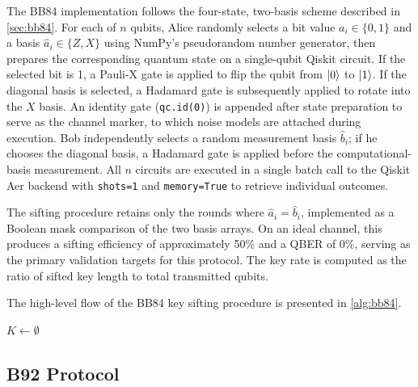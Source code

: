 \documentclass[10pt, a4paper]{report}
\begin{document}
The BB84 implementation follows the four-state, two-basis scheme described in \cref{sec:bb84}. For each of $n$ qubits, Alice randomly selects a bit value $a_i \in \{0,1\}$ and a basis $\hat{a}_i \in \{Z, X\}$ using NumPy's pseudorandom number generator, then prepares the corresponding quantum state on a single-qubit Qiskit circuit. If the selected bit is 1, a Pauli-X gate is applied to flip the qubit from $\ket{0}$ to $\ket{1}$. If the diagonal basis is selected, a Hadamard gate is subsequently applied to rotate into the $X$ basis. An identity gate (\texttt{qc.id(0)}) is appended after state preparation to serve as the channel marker, to which noise models are attached during execution. Bob independently selects a random measurement basis $\hat{b}_i$; if he chooses the diagonal basis, a Hadamard gate is applied before the computational-basis measurement. All $n$ circuits are executed in a single batch call to the Qiskit Aer backend with \texttt{shots=1} and \texttt{memory=True} to retrieve individual outcomes.

The sifting procedure retains only the rounds where $\hat{a}_i = \hat{b}_i$, implemented as a Boolean mask comparison of the two basis arrays. On an ideal channel, this produces a sifting efficiency of approximately 50\% and a QBER of 0\%, serving as the primary validation targets for this protocol. The key rate is computed as the ratio of sifted key length to total transmitted qubits.

% 

The high-level flow of the BB84 key sifting procedure is presented in \cref{alg:bb84}.

\begin{algorithm}[H]
    \caption{BB84 Key Sifting Procedure}\label{alg:bb84}
    $K \leftarrow \emptyset$\;
\end{algorithm}


\subsection{B92 Protocol}
\end{document}
